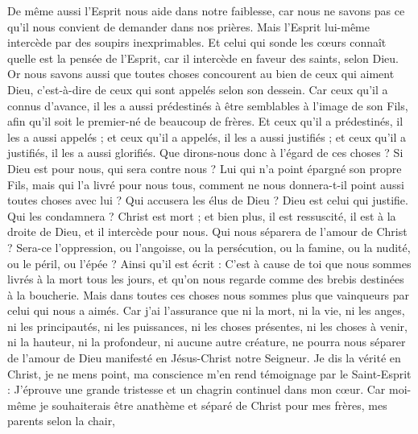 \begin{multicols}{2}
De même aussi l’Esprit nous aide dans notre faiblesse, car nous ne savons pas ce qu’il nous convient de demander dans nos prières. Mais l’Esprit lui-même intercède par des soupirs inexprimables.
Et celui qui sonde les cœurs connaît quelle est la pensée de l'Esprit, car il intercède en faveur des saints, selon Dieu.
Or nous savons aussi que toutes choses concourent au bien de ceux qui aiment Dieu, c'est-à-dire de ceux qui sont appelés selon son dessein.
Car ceux qu'il a connus d’avance, il les a aussi prédestinés à être semblables à l'image de son Fils, afin qu'il soit le premier-né de beaucoup de frères.
Et ceux qu'il a prédestinés, il les a aussi appelés ; et ceux qu'il a appelés, il les a aussi justifiés ; et ceux qu'il a justifiés, il les a aussi glorifiés.
Que dirons-nous donc à l’égard de ces choses ? Si Dieu est pour nous, qui sera contre nous ?
Lui qui n'a point épargné son propre Fils, mais qui l'a livré pour nous tous, comment ne nous donnera-t-il point aussi toutes choses avec lui ?
Qui accusera les élus de Dieu ? Dieu est celui qui justifie.
Qui les condamnera ? Christ est mort ; et bien plus, il est ressuscité, il est à la droite de Dieu, et il intercède pour nous.
Qui nous séparera de l'amour de Christ ? Sera-ce l'oppression, ou l'angoisse, ou la persécution, ou la famine, ou la nudité, ou le péril, ou l'épée ?
Ainsi qu'il est écrit : C’est à cause de toi que nous sommes livrés à la mort tous les jours, et qu’on nous regarde comme des brebis destinées à la boucherie.
Mais dans toutes ces choses nous sommes plus que vainqueurs par celui qui nous a aimés.
Car j’ai l’assurance que ni la mort, ni la vie, ni les anges, ni les principautés, ni les puissances, ni les choses présentes, ni les choses à venir,
ni la hauteur, ni la profondeur, ni aucune autre créature, ne pourra nous séparer de l'amour de Dieu manifesté en Jésus-Christ notre Seigneur.
\VerseOne{}Je dis la vérité en Christ, je ne mens point, ma conscience m’en rend témoignage par le Saint-Esprit :
J’éprouve une grande tristesse et un chagrin continuel dans mon cœur.
Car moi-même je souhaiterais être anathème et séparé de Christ pour mes frères, mes parents selon la chair,

\end{multicols}
